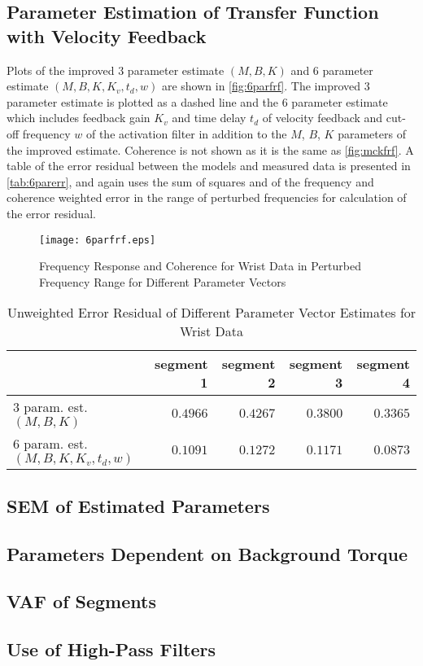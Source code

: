 \documentclass[11pt,a4paper]{article}
\begin{document}
\subsection{Parameter Estimation of Transfer Function with Velocity Feedback}
Plots of the improved 3 parameter estimate $(M, B, K)$ and 6 parameter estimate
$(M, B, K, K_v, t_d, w)$ are shown in \autoref{fig:6parfrf}. The improved 3
parameter estimate is plotted as a dashed line and the 6 parameter estimate
which includes feedback gain $K_v$ and time delay $t_d$ of velocity feedback
and cut-off frequency $w$ of the activation filter in addition to the $M$, $B$,
$K$ parameters of the improved estimate.  Coherence is not shown as it is the
same as \autoref{fig:mckfrf}. A table of the error residual between the models
and measured data is presented in \autoref{tab:6parerr}, and again uses the sum
of squares and of the frequency and coherence weighted error in the range of
perturbed frequencies for calculation of the error residual.

\begin{figure}
    \centering
    \texttt{[image: 6parfrf.eps]}
    \caption{Frequency Response and Coherence for Wrist Data in Perturbed
        Frequency Range for Different Parameter Vectors}
    \label{fig:6parfrf}
\end{figure}

\begin{table}[hb]
    \centering
    \begin{tabular}{|l|r|r|r|r|}
        \hline
        \nonumber & segment 1 & segment 2 & segment 3 & segment 4 \\
        \hline
        3 param. est. $(M, B, K)$ &
            $0.4966$ & $0.4267$ & $0.3800$ & $0.3365$ \\
        6 param. est. $(M, B, K, K_v, t_d, w)$ &
            $0.1091$ & $0.1272$ & $0.1171$ & $0.0873$ \\
        \hline
    \end{tabular}
    \caption{Unweighted Error Residual of Different Parameter Vector Estimates
        for Wrist Data}
    \label{tab:6parerr}
\end{table}

\subsection{SEM of Estimated Parameters}

\subsection{Parameters Dependent on Background Torque}

\subsection{VAF of Segments}

\subsection{Use of High-Pass Filters}
\end{document}
